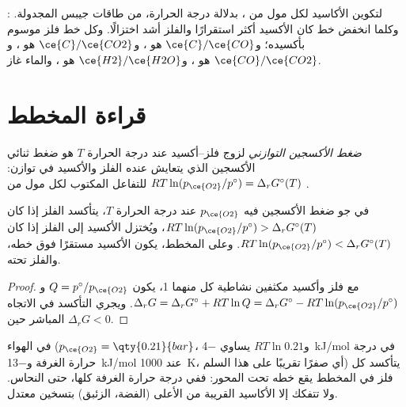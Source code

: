 \begin{omfigure}
{\small {}:  لتكوين الأكاسيد
لكل مول من ، بدلالة درجة الحرارة، من طاقات جيبس المجدولة. وكلما
انخفض خط كان الأكسيد أكثر استقرارًا والفلز أشد اختزالًا.
وكل خط فلز موسوم بأكسيده؛ و$\ce{C}/\ce{CO}$ هو ،
و$\ce{C}/\ce{CO2}$ هو ، و$\ce{CO}/\ce{CO2}$ هو ،
و$\ce{H2}/\ce{H2O}$ هو ، والماء غاز.}
\end{omfigure}

\section{قراءة المخطط}

\begin{definition}\label{def:b2:ellingham:oxygen-pressure}
\emph{ضغط الأكسجين التوازني} لزوج
فلز--أكسيد عند درجة الحرارة $T$ هو ضغط ثنائي الأكسجين الذي يتعايش عنده الفلز
والأكسيد في توازن: $RT\ln(p_{\ce{O2}}/p^\circ) = \Delta_r
G^\circ(T)$ للتفاعل المكتوب لكل مول من .
\end{definition}

\begin{theorem}\label{thm:b2:ellingham:domains}
في جو ضغط الأكسجين فيه $p_{\ce{O2}}$ عند درجة الحرارة $T$، يتأكسد
الفلز إذا كان $RT\ln(p_{\ce{O2}}/p^\circ) > \Delta_r G^\circ(T)$، ويُختزل
الأكسيد إلى الفلز إذا كان $RT\ln(p_{\ce{O2}}/p^\circ) < \Delta_r
G^\circ(T)$. وعلى المخطط، يكون الأكسيد مستقرًا فوق خطه، والفلز
تحته.
\end{theorem}

\begin{proof}
مع فلز وأكسيد مكثفين نشاطية كل منهما 1، يكون $Q = p^\circ/p_{\ce{O2}}$ 
و$\Delta_r G = \Delta_r G^\circ + RT\ln Q = \Delta_r G^\circ - RT\ln(p_{\ce{O2}}/
p^\circ)$. ويجري التأكسد في الاتجاه المباشر حين $\Delta_r G < 0$.
\end{proof}

في الهواء ($p_{\ce{O2}} = \qty{0.21}{bar}$، و$RT\ln 0.21$ يساوي \qty{-4}{kJ/mol}
في درجة حرارة الغرفة و\qty{-13}{kJ/mol} عند \qty{1000}{K}، أي صفرًا تقريبًا على هذا
السلم) يتأكسد كل فلز في المخطط يقع خطه
تحت المحور: ففي درجة حرارة الغرفة كلها، حتى النحاس.
ولا تتفكك إلا الأكاسيد القريبة من الأعلى (الفضة، الزئبق) بتسخين
معتدل.

